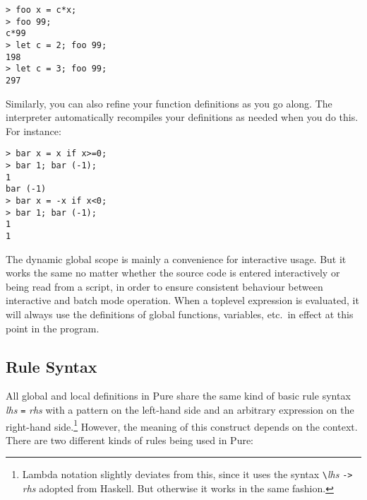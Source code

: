 \documentclass[a4paper,12pt]{article}
\newcommand{\nt}[1]{\textrm{\textit{#1\/}}}
\begin{document}
\begin{lstlisting}
> foo x = c*x;
> foo 99;
c*99
> let c = 2; foo 99;
198
> let c = 3; foo 99;
297
\end{lstlisting}

Similarly, you can also refine your function definitions as you go along. The interpreter automatically recompiles your definitions as needed when you do this. For instance:

\begin{lstlisting}
> bar x = x if x>=0;
> bar 1; bar (-1);
1
bar (-1)
> bar x = -x if x<0;
> bar 1; bar (-1);
1
1
\end{lstlisting}

The dynamic global scope is mainly a convenience for interactive usage. But it works the same no matter whether the source code is entered interactively or being read from a script, in order to ensure consistent behaviour between interactive and batch mode operation. When a toplevel expression is evaluated, it will always use the definitions of global functions, variables, etc.\ in effect at this point in the program.

\subsection{Rule Syntax}
\label{Rule Syntax}

All global and local definitions in Pure share the same kind of basic rule syntax \nt{lhs} \verb|=| \nt{rhs} with a pattern on the left-hand side and an arbitrary expression on the right-hand side.\footnote{Lambda notation slightly deviates from this, since it uses the syntax \texttt{\textbackslash}\nt{lhs} \texttt{-\textgreater} \nt{rhs} adopted from Haskell. But otherwise it works in the same fashion.} However, the meaning of this construct depends on the context. There are two different kinds of rules being used in Pure:
\end{document}
